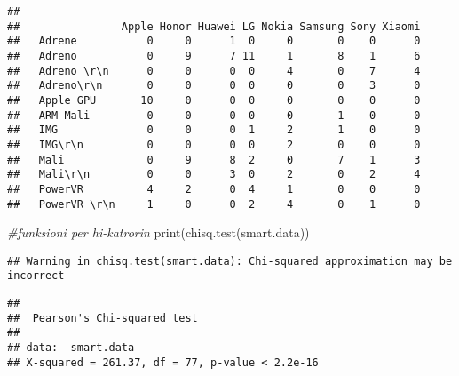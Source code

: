 \documentclass[
]{article}
\newenvironment{Shaded}{\begin{snugshade}}{\end{snugshade}}
\newcommand{\CommentTok}[1]{\textcolor[rgb]{0.56,0.35,0.01}{\textit{#1}}}
\newcommand{\FunctionTok}[1]{\textcolor[rgb]{0.00,0.00,0.00}{#1}}
\newcommand{\NormalTok}[1]{#1}
\newcommand{\OtherTok}[1]{\textcolor[rgb]{0.56,0.35,0.01}{#1}}
\newcommand{\SpecialCharTok}[1]{\textcolor[rgb]{0.00,0.00,0.00}{#1}}
\newcommand{\StringTok}[1]{\textcolor[rgb]{0.31,0.60,0.02}{#1}}
\begin{document}
\begin{Shaded}
\end{Shaded}

\begin{verbatim}
##               
##                Apple Honor Huawei LG Nokia Samsung Sony Xiaomi
##   Adrene           0     0      1  0     0       0    0      0
##   Adreno           0     9      7 11     1       8    1      6
##   Adreno \r\n      0     0      0  0     4       0    7      4
##   Adreno\r\n       0     0      0  0     0       0    3      0
##   Apple GPU       10     0      0  0     0       0    0      0
##   ARM Mali         0     0      0  0     0       1    0      0
##   IMG              0     0      0  1     2       1    0      0
##   IMG\r\n          0     0      0  0     2       0    0      0
##   Mali             0     9      8  2     0       7    1      3
##   Mali\r\n         0     0      3  0     2       0    2      4
##   PowerVR          4     2      0  4     1       0    0      0
##   PowerVR \r\n     1     0      0  2     4       0    1      0
\end{verbatim}

\begin{Shaded}
\begin{Highlighting}[]
\CommentTok{\#funksioni per hi{-}katrorin}
\FunctionTok{print}\NormalTok{(}\FunctionTok{chisq.test}\NormalTok{(smart.data))}
\end{Highlighting}
\end{Shaded}

\begin{verbatim}
## Warning in chisq.test(smart.data): Chi-squared approximation may be incorrect
\end{verbatim}

\begin{verbatim}
## 
##  Pearson's Chi-squared test
## 
## data:  smart.data
## X-squared = 261.37, df = 77, p-value < 2.2e-16
\end{verbatim}
\end{document}
